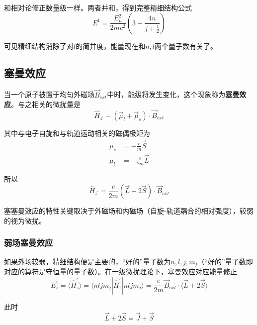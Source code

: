 \documentclass[UTF8]{ctexart}
\begin{document}
\noindent 和相对论修正数量级一样。两者并和，得到完整精细结构公式
\begin{equation}
    E^{1}=\frac{E_{n}^{2}}{2 m c^{2}}\left(3-\frac{4 n}{j+\frac{1}{2}}\right)
\end{equation}

\noindent 可见精细结构消除了对$l$的简并度，能量现在和$n,l$两个量子数有关了。

    \subsection{塞曼效应}
    当一个原子被置于均匀外磁场$\vec{B}_{ext}$中时，能级将发生变化，这个现象称为\textbf{塞曼效应}。与之相关的微扰量是
    \begin{equation}
        \hat{H}_{z^{\prime}} - \left(\vec{\mu}_l + \vec{\mu}_s\right) \cdot \vec{B}_{ext}
    \end{equation}

\noindent 其中与电子自旋和与轨道运动相关的磁偶极矩为
\begin{equation}
    \begin{aligned}
        \mu_s &= - \frac{e}{m} \vec{S} \\ 
        \mu_l &= - \frac{e}{2m} \vec{L}
    \end{aligned}
\end{equation}

    所以 
    \begin{equation}
        \hat{H}_{z^{\prime}} = \frac{e}{2m} (\vec{L} + 2\vec{S}) \cdot \vec{B}_{ext}
    \end{equation}

    塞塞曼效应的特性关键取决于外磁场和内磁场（自旋-轨道耦合的相对强度），较弱的视为微扰。

    \subsubsection{弱场塞曼效应}
    如果外场较弱，精细结构便是主要的，“好的”量子数为$n,l,j,m_j$（“好的”量子数即对应的算符是守恒量的量子数）。在一级微扰理论下，塞曼效应对应能量修正
    \begin{equation}
        E_z^1 = \langle \hat{H}_z^{\prime} \rangle = \langle nljm_j | \hat{H}_z^{\prime}  | nljm_j\rangle = \frac{e}{2m}\vec{B}_{ext} \cdot \langle \vec{L} + 2 \vec{S} \rangle   
    \end{equation}

\noindent 此时
\begin{equation}
    \vec{L} + 2\vec{S} = \vec{J} + \vec{S}
\end{equation}
\end{document}
